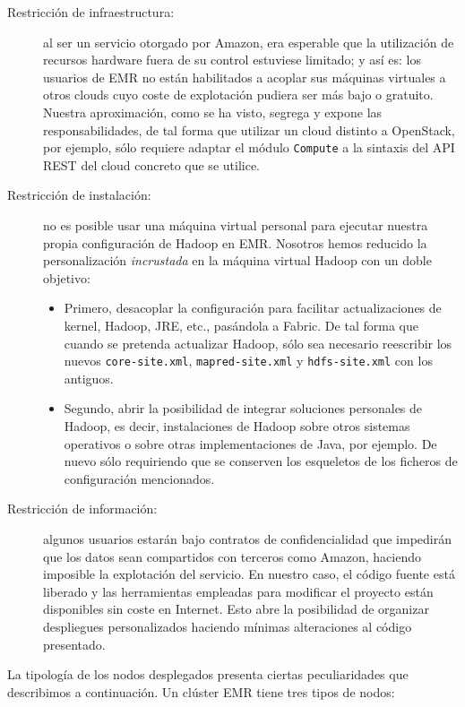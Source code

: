 \begin{description}
 \item[Restricci\'on de infraestructura:] al ser un servicio otorgado por Amazon, era esperable que la utilizaci\'on de recursos hardware fuera de su control estuviese limitado; y as\'i es: los usuarios de EMR no est\'an habilitados a acoplar sus m\'aquinas virtuales a otros clouds cuyo coste de explotaci\'on pudiera ser m\'as bajo o gratuito.
 Nuestra aproximaci\'on, como se ha visto, segrega y expone las responsabilidades, de tal forma que utilizar un cloud distinto a OpenStack, por ejemplo, s\'olo requiere adaptar el m\'odulo \texttt{Compute} a la sintaxis del API REST del cloud concreto que se utilice.
 \item[Restricci\'on de instalaci\'on:] no es posible usar una m\'aquina virtual personal para ejecutar nuestra propia configuraci\'on de Hadoop en EMR. Nosotros hemos reducido la personalizaci\'on \emph{incrustada} en la m\'aquina virtual Hadoop con un doble objetivo:
   \begin{itemize}
    \item Primero, desacoplar la configuraci\'on para facilitar actualizaciones de kernel, Hadoop, JRE, etc., pas\'andola a Fabric. De tal forma que cuando se pretenda actualizar Hadoop, s\'olo sea necesario reescribir los nuevos \texttt{core-site.xml}, \texttt{mapred-site.xml} y \texttt{hdfs-site.xml} con los antiguos.
    \item Segundo, abrir la posibilidad de integrar soluciones personales de Hadoop, es decir, instalaciones de Hadoop sobre otros sistemas operativos o sobre otras implementaciones de Java, por ejemplo. De nuevo s\'olo requiriendo que se conserven los esqueletos de los ficheros de configuraci\'on mencionados.
   \end{itemize}
 \item[Restricci\'on de informaci\'on:] algunos usuarios estar\'an bajo contratos de confidencialidad que impedir\'an que los datos sean compartidos con terceros como Amazon, haciendo imposible la explotaci\'on del servicio. En nuestro caso, el c\'odigo fuente est\'a liberado y las herramientas empleadas para modificar el proyecto est\'an disponibles sin coste en Internet. Esto abre la posibilidad de organizar despliegues personalizados haciendo m\'inimas alteraciones al c\'odigo presentado.
\end{description}

La tipolog\'ia de los nodos desplegados presenta ciertas peculiaridades que describimos a continuaci\'on. Un cl\'uster EMR tiene tres tipos de nodos:

